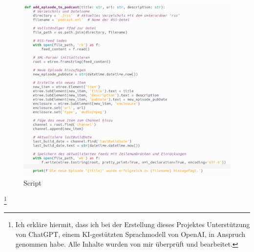 \documentclass[a4paper,12pt]{article}
\begin{document}
\begin{figure}[H]
    \centering
    \includegraphics[width=0.9\linewidth]{Pics/RSSScript1.png}
    \caption{Script}
    \label{fig:enter-label}
\end{figure}
\footnote{Ich erkläre hiermit, dass ich bei der Erstellung dieses Projektes Unterstützung von ChatGPT, einem KI-gestützten Sprachmodell von OpenAI, in Anspruch genommen habe. Alle Inhalte wurden von mir überprüft und bearbeitet.}
\end{document}
